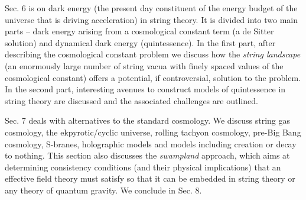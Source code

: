 Sec. 6 is on dark energy (the present day constituent of the energy budget of the universe that is driving acceleration) in string theory. It is divided into two main parts -- dark energy arising from a cosmological constant term (a de Sitter solution) and dynamical dark energy (quintessence). In the
first part, after describing the cosmological constant problem we discuss how the {\it string landscape} (an enormously large number of string vacua with finely spaced values of the cosmological constant) offers a potential, if controversial, solution to the problem. In the second part, interesting avenues to construct models of quintessence in string theory are discussed and the associated challenges are outlined.

Sec. 7 deals with alternatives to the standard cosmology. We discuss string gas cosmology, the ekpyrotic/cyclic universe, rolling tachyon cosmology, pre-Big Bang cosmology, S-branes, holographic models and  models including creation or decay to nothing. This section also discusses  the {\it swampland} approach, which aims at determining consistency conditions (and their physical implications) that an effective field theory must satisfy so that it can be embedded in string theory or any theory of quantum gravity. We conclude in Sec. 8.

\enddocument

 \newpage
 
 
 
 
 
 
 
 
 
 
 
 
 
 